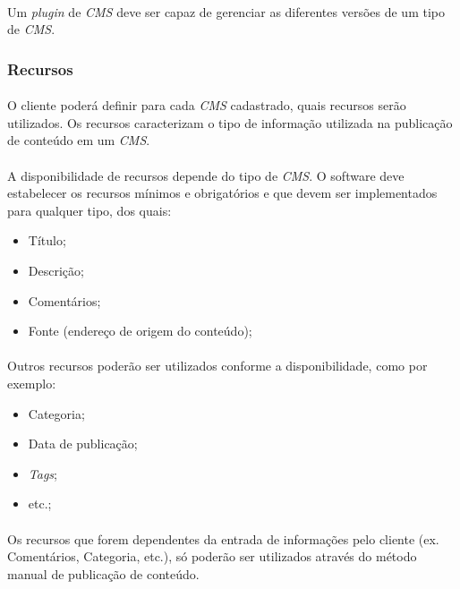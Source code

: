 \documentclass[a4paper,12pt]{article}
\def\cms{\emph{CMS}}
\begin{document}

\paragraph{}
Um \emph{plugin} de \cms{} deve ser capaz de gerenciar as diferentes versões de
um tipo de \cms{}.

\subsubsection{Recursos}

\paragraph{}
O cliente poderá definir para cada \cms{} cadastrado, quais recursos serão
utilizados. Os recursos caracterizam o tipo de informação utilizada na
publicação de conteúdo em um \cms{}.

\paragraph{}
A disponibilidade de recursos depende do tipo de \cms{}. O software deve
estabelecer os recursos mínimos e obrigatórios e que devem ser implementados
para qualquer tipo, dos quais:

\begin{itemize}
\item Título;
\item Descrição;
\item Comentários;
\item Fonte (endereço de origem do conteúdo);
\end{itemize}

\paragraph{}
Outros recursos poderão ser utilizados conforme a disponibilidade, como por
exemplo:

\begin{itemize}
\item Categoria;
\item Data de publicação;
\item \emph{Tags};
\item etc.;
\end{itemize}

\paragraph{}
Os recursos que forem dependentes da entrada de informações pelo cliente (ex. Comentários, Categoria, etc.), só poderão ser utilizados através do método manual de publicação de conteúdo.
\end{document}
